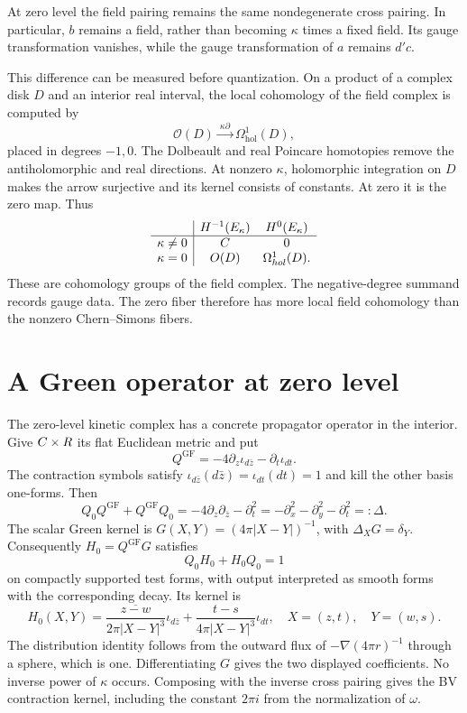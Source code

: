 At zero level the field pairing remains the same nondegenerate cross
pairing.  In particular, $b$ remains a field, rather than becoming
$\kappa$ times a fixed field.  Its gauge transformation vanishes,
while the gauge transformation of $a$ remains $d'c$.

This difference can be measured before quantization.  On a product
of a complex disk $D$ and an interior real interval, the local
cohomology of the field complex is computed by
\[
 \mathcal O(D)\xrightarrow{\ \kappa\partial\ }
 \Omega^1_{\mathrm{hol}}(D),
\]
placed in degrees $-1,0$.  The Dolbeault and real Poincare homotopies
remove the antiholomorphic and real directions.  At nonzero $\kappa$,
holomorphic integration on $D$ makes the arrow surjective and its
kernel consists of constants.  At zero it is the zero map.  Thus
\[
\begin{array}{c|cc}
 &H^{-1}(E_\kappa)&H^0(E_\kappa)\\\hline
 \kappa\ne0&C&0\\
 \kappa=0&O(D)&\Omega^1_{hol}(D).
\end{array}
\]
These are cohomology groups of the field complex.  The negative-degree
summand records gauge data.  The zero fiber therefore has more local
field cohomology than the nonzero Chern--Simons fibers.

\section{A Green operator at zero level}

The zero-level kinetic complex has a concrete propagator operator in
the interior.  Give $C\times R$ its flat Euclidean metric and put
\[
 Q^{\mathrm{GF}}=-4\partial_z\iota_{d\bar z}
                         -\partial_t\iota_{dt}.
\]
The contraction symbols satisfy
$\iota_{d\bar z}(d\bar z)=\iota_{dt}(dt)=1$ and kill the other
basis one-forms.  Then
\[
 Q_0Q^{\mathrm{GF}}+Q^{\mathrm{GF}}Q_0
 =-4\partial_z\partial_{\bar z}-\partial_t^2
 =-\partial_x^2-\partial_y^2-\partial_t^2=:\Delta.
\]
The scalar Green kernel is
$G(X,Y)=(4\pi|X-Y|)^{-1}$, with $\Delta_XG=\delta_Y$.
Consequently $H_0=Q^{\mathrm{GF}}G$ satisfies
\[
 Q_0H_0+H_0Q_0=1
\]
on compactly supported test forms, with output interpreted as smooth
forms with the corresponding decay.  Its kernel is
\[
 H_0(X,Y)=
 \frac{\overline{z-w}}{2\pi|X-Y|^3}\iota_{d\bar z}
 +\frac{t-s}{4\pi|X-Y|^3}\iota_{dt},
 \quad X=(z,t),\quad Y=(w,s).
\]
The distribution identity follows from the outward flux of
$-\nabla(4\pi r)^{-1}$ through a sphere, which is one.
Differentiating $G$ gives the two displayed coefficients.
No inverse power of $\kappa$ occurs.  Composing with the inverse
cross pairing gives the BV contraction kernel, including the constant
$2\pi i$ from the normalization of $\omega$.


